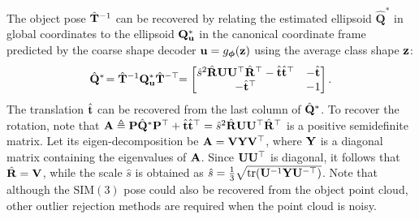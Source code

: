 The object pose $\hat{\mathbf{T}}^{-1}$ can be recovered by relating the estimated ellipsoid $\hat{\mathbf{Q}}^*$ in global coordinates to the ellipsoid $\mathbf{Q}^*_{\mathbf{u}}$ in the canonical coordinate frame predicted by the coarse shape decoder $\mathbf{u} = g_{\boldsymbol{\phi}}(\mathbf{z})$ using the average class shape $\mathbf{z}$: 
\begin{equation*}
\begin{aligned}
\hat{\mathbf{Q}}^*\! =
\hat{\mathbf{T}}^{-1} \mathbf{Q}_{\mathbf{u}}^* \hat{\mathbf{T}}^{-\top}\!\!=
\begin{bmatrix} 
\hat{s}^2 \hat{\mathbf{R}} \mathbf{U}\mathbf{U}^\top \hat{\mathbf{R}}^\top -  \hat{\mathbf{t}} \hat{\mathbf{t}}^\top & - \hat{\mathbf{t}} \\ -\hat{\mathbf{t}}^\top & -1
\end{bmatrix}.
\end{aligned}
\end{equation*}
The translation $\hat{\mathbf{t}}$ can be recovered from the last column of $\hat{\mathbf{Q}}^*$.
To recover the rotation, note that $\mathbf{A} \triangleq \mathbf{P}\hat{\mathbf{Q}}^*\mathbf{P}^\top  + \hat{\mathbf{t}} \hat{\mathbf{t}}^\top = \hat{s}^2\hat{\mathbf{R}}\mathbf{U}\mathbf{U}^\top\hat{\mathbf{R}}^\top$ is a positive semidefinite matrix. Let its eigen-decomposition be $\mathbf{A} = \mathbf{V}\mathbf{Y}\mathbf{V}^\top$, where $\mathbf{Y}$ is a diagonal matrix containing the eigenvalues of $\mathbf{A}$. Since $\mathbf{U}\mathbf{U}^\top$ is diagonal, it follows that $\hat{\mathbf{R}} = \mathbf{V}$, while the scale $\hat{s}$ is obtained as $\hat{s} = \frac{1}{3} \sqrt{\operatorname{tr}(\mathbf{U}^{-1}\mathbf{Y} \mathbf{U}^{-\top})}$.
%
%
Note that although the $\text{SIM}(3)$ pose could also be recovered from the object point cloud, other outlier rejection methods are required \cite{wu2020eao} when the point cloud is noisy. 



